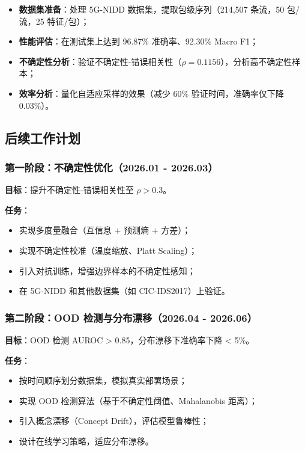 \begin{itemize}
  \item \textbf{数据集准备}：处理 5G-NIDD 数据集，提取包级序列（214,507 条流，50 包/流，25 特征/包）；
  \item \textbf{性能评估}：在测试集上达到 96.87\% 准确率、92.30\% Macro F1；
  \item \textbf{不确定性分析}：验证不确定性-错误相关性（$\rho=0.1156$），分析高不确定性样本；
  \item \textbf{效率分析}：量化自适应采样的效果（减少 60\% 验证时间，准确率仅下降 0.03\%）。
\end{itemize}

\subsection{后续工作计划}

\subsubsection{第一阶段：不确定性优化（2026.01 - 2026.03）}

\textbf{目标}：提升不确定性-错误相关性至 $\rho > 0.3$。

\textbf{任务}：
\begin{itemize}
  \item 实现多度量融合（互信息 + 预测熵 + 方差）；
  \item 实现不确定性校准（温度缩放、Platt Scaling）；
  \item 引入对抗训练，增强边界样本的不确定性感知；
  \item 在 5G-NIDD 和其他数据集（如 CIC-IDS2017）上验证。
\end{itemize}


\subsubsection{第二阶段：OOD 检测与分布漂移（2026.04 - 2026.06）}

\textbf{目标}：OOD 检测 AUROC > 0.85，分布漂移下准确率下降 < 5\%。

\textbf{任务}：
\begin{itemize}
  \item 按时间顺序划分数据集，模拟真实部署场景；
  \item 实现 OOD 检测算法（基于不确定性阈值、Mahalanobis 距离）；
  \item 引入概念漂移（Concept Drift），评估模型鲁棒性；
  \item 设计在线学习策略，适应分布漂移。
\end{itemize}



